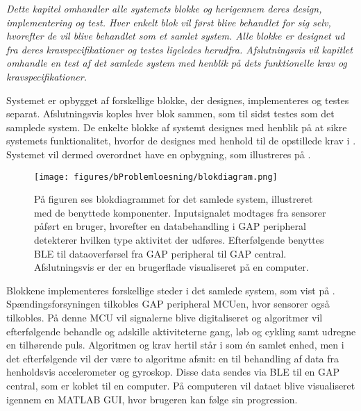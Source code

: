 \textit{Dette kapitel omhandler alle systemets blokke og herigennem deres design, implementering og test. Hver enkelt blok vil først blive behandlet for sig selv, hvorefter de vil blive behandlet som et samlet system. Alle blokke er designet ud fra deres kravspecifikationer og testes ligeledes herudfra. Afslutningsvis vil kapitlet omhandle en test af det samlede system med henblik på dets funktionelle krav og kravspecifikationer.}

Systemet er opbygget af forskellige blokke, der designes, implementeres og testes separat. Afslutningsvis koples hver blok sammen, som til sidst testes som det samplede system. De enkelte blokke af systemt designes med henblik på at sikre systemets funktionalitet, hvorfor de designes med henhold til de opstillede krav i . Systemet vil dermed overordnet have en opbygning, som illustreres på .
\begin{figure}[H]
	\centering
	\texttt{[image: figures/bProblemloesning/blokdiagram.png]}
	\caption{På figuren ses blokdiagrammet for det samlede system, illustreret med de benyttede komponenter. Inputsignalet modtages fra sensorer påført en bruger, hvorefter en databehandling i GAP peripheral detekterer hvilken type aktivitet der udføres. Efterfølgende benyttes BLE til dataoverførsel fra GAP peripheral til GAP central. Afslutningsvis er der en brugerflade visualiseret på en computer.}
	\label{fig:design_blokdiagram}
\end{figure}
Blokkene implementeres forskellige steder i det samlede system, som vist på . Spændingsforsyningen tilkobles GAP peripheral MCUen, hvor sensorer også tilkobles. På denne MCU vil signalerne blive digitaliseret og algoritmer vil efterfølgende behandle og adskille aktiviteterne gang, løb og cykling samt udregne en tilhørende puls. Algoritmen og krav hertil står i  som én samlet enhed, men i det efterfølgende vil der være to algoritme afsnit: en til behandling af data fra henholdsvis accelerometer og gyroskop. Disse data sendes via BLE til en GAP central, som er koblet til en computer. På computeren vil dataet blive visualiseret igennem en MATLAB GUI, hvor brugeren kan følge sin progression.